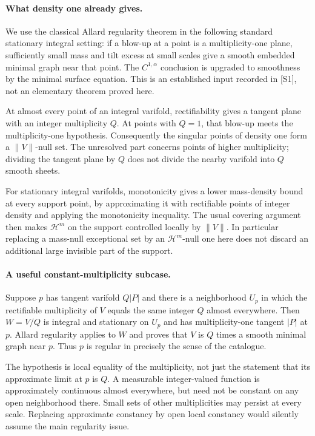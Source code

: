 \documentclass[11pt]{article}
\begin{document}
\paragraph{What density one already gives.}
We use the classical Allard regularity theorem in the following standard
stationary integral setting: if a blow-up at a point is a
multiplicity-one plane, sufficiently small mass and tilt excess at
small scales give a smooth embedded minimal graph near that point.
The $C^{1,\alpha}$ conclusion is upgraded to smoothness by the minimal
surface equation. This is an established input recorded in [S1],
not an elementary theorem proved here.

At almost every point of an integral varifold, rectifiability gives
a tangent plane with an integer multiplicity $Q$. At points with
$Q=1$, that blow-up meets the multiplicity-one hypothesis.
Consequently the singular points of density one form a
$\|V\|$-null set. The unresolved part concerns points of
higher multiplicity; dividing the tangent plane by $Q$
does not divide the nearby varifold into $Q$ smooth sheets.

For stationary integral varifolds, monotonicity gives a lower
mass-density bound at every support point, by approximating
it with rectifiable points of integer density and applying
the monotonicity inequality. The usual covering argument
then makes $\mathcal H^m$ on the support controlled locally
by $\|V\|$. In particular replacing a mass-null exceptional
set by an $\mathcal H^m$-null one here does not discard
an additional large invisible part of the support.

\paragraph{A useful constant-multiplicity subcase.}
Suppose $p$ has tangent varifold $Q|P|$ and there is a neighborhood
$U_p$ in which the rectifiable multiplicity of $V$ equals
the same integer $Q$ almost everywhere. Then
$W=V/Q$ is integral and stationary on $U_p$ and has
multiplicity-one tangent $|P|$ at $p$. Allard regularity
applies to $W$ and proves that $V$ is $Q$ times a smooth
minimal graph near $p$. Thus $p$ is regular in precisely
the sense of the catalogue.

The hypothesis is local equality of the multiplicity,
not just the statement that its approximate limit at
$p$ is $Q$. A measurable integer-valued function is
approximately continuous almost everywhere, but need
not be constant on any open neighborhood there.
Small sets of other multiplicities may persist at every
scale. Replacing approximate constancy by open local
constancy would silently assume the main regularity issue.
\end{document}
